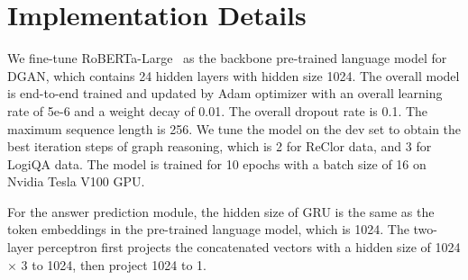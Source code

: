 \documentclass[11pt]{article}
\begin{document}
\section{Implementation Details}
\label{sec:appendix_implementation_details}
We fine-tune RoBERTa-Large~\cite{liu2019roberta} as the backbone pre-trained language model for DGAN, which contains 24 hidden layers with hidden size 1024. 
The overall model is end-to-end trained and updated by Adam \cite{kingma2014adam} optimizer with an overall learning rate of 5e-6 and a weight decay of 0.01. The overall dropout rate is 0.1. The maximum sequence length is 256. 
We tune the model on the dev set to obtain the best iteration steps of graph reasoning, which is 2 for ReClor data, and 3 for LogiQA data.
The model is trained for 10 epochs with a batch size of 16 on Nvidia Tesla V100 GPU.

For the answer prediction module,  the hidden size of GRU is the same as the token embeddings in the pre-trained language model, which is 1024.
The two-layer perceptron first projects the concatenated vectors with a hidden size of 1024 $\times$ 3 to 1024, then project 1024 to 1.
\end{document}
